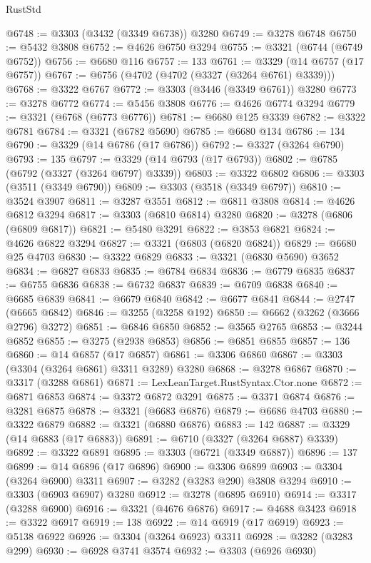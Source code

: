 \begin{lexlean}{RustStd}
\begin{coremodule}
@6748 := @3303 (@3432 (@3349 @6738)) @3280
@6749 := @3278 @6748
@6750 := @5432 @3808
@6752 := @4626 @6750 @3294
@6755 := @3321 (@6744 (@6749 @6752))
@6756 := @6680 @116
@6757 := 133
@6761 := @3329 (@14 @6757 (@17 @6757))
@6767 := @6756 (@4702 (@4702 (@3327 (@3264 @6761) @3339)))
@6768 := @3322 @6767
@6772 := @3303 (@3446 (@3349 @6761)) @3280
@6773 := @3278 @6772
@6774 := @5456 @3808
@6776 := @4626 @6774 @3294
@6779 := @3321 (@6768 (@6773 @6776))
@6781 := @6680 @125 @3339
@6782 := @3322 @6781
@6784 := @3321 (@6782 @5690)
@6785 := @6680 @134
@6786 := 134
@6790 := @3329 (@14 @6786 (@17 @6786))
@6792 := @3327 (@3264 @6790)
@6793 := 135
@6797 := @3329 (@14 @6793 (@17 @6793))
@6802 := @6785 (@6792 (@3327 (@3264 @6797) @3339))
@6803 := @3322 @6802
@6806 := @3303 (@3511 (@3349 @6790))
@6809 := @3303 (@3518 (@3349 @6797))
@6810 := @3524 @3907
@6811 := @3287 @3551
@6812 := @6811 @3808
@6814 := @4626 @6812 @3294
@6817 := @3303 (@6810 @6814) @3280
@6820 := @3278 (@6806 (@6809 @6817))
@6821 := @5480 @3291
@6822 := @3853 @6821
@6824 := @4626 @6822 @3294
@6827 := @3321 (@6803 (@6820 @6824))
@6829 := @6680 @25 @4703
@6830 := @3322 @6829
@6833 := @3321 (@6830 @5690) @3652
@6834 := @6827 @6833
@6835 := @6784 @6834
@6836 := @6779 @6835
@6837 := @6755 @6836
@6838 := @6732 @6837
@6839 := @6709 @6838
@6840 := @6685 @6839
@6841 := @6679 @6840
@6842 := @6677 @6841
@6844 := @2747 (@6665 @6842)
@6846 := @3255 (@3258 @192)
@6850 := @6662 (@3262 (@3666 @2796) @3272)
@6851 := @6846 @6850
@6852 := @3565 @2765
@6853 := @3244 @6852
@6855 := @3275 (@2938 @6853)
@6856 := @6851 @6855
@6857 := 136
@6860 := @14 @6857 (@17 @6857)
@6861 := @3306 @6860
@6867 := @3303 (@3304 (@3264 @6861) @3311 @3289) @3280
@6868 := @3278 @6867
@6870 := @3317 (@3288 @6861)
@6871 := LexLeanTarget.RustSyntax.Ctor.none
@6872 := @6871 @6853
@6874 := @3372 @6872 @3291
@6875 := @3371 @6874
@6876 := @3281 @6875
@6878 := @3321 (@6683 @6876)
@6879 := @6686 @4703
@6880 := @3322 @6879
@6882 := @3321 (@6880 @6876)
@6883 := 142
@6887 := @3329 (@14 @6883 (@17 @6883))
@6891 := @6710 (@3327 (@3264 @6887) @3339)
@6892 := @3322 @6891
@6895 := @3303 (@6721 (@3349 @6887))
@6896 := 137
@6899 := @14 @6896 (@17 @6896)
@6900 := @3306 @6899
@6903 := @3304 (@3264 @6900) @3311
@6907 := @3282 (@3283 @290) @3808 @3294
@6910 := @3303 (@6903 @6907) @3280
@6912 := @3278 (@6895 @6910)
@6914 := @3317 (@3288 @6900)
@6916 := @3321 (@4676 @6876)
@6917 := @4688 @3423
@6918 := @3322 @6917
@6919 := 138
@6922 := @14 @6919 (@17 @6919)
@6923 := @5138 @6922
@6926 := @3304 (@3264 @6923) @3311
@6928 := @3282 (@3283 @299)
@6930 := @6928 @3741 @3574
@6932 := @3303 (@6926 @6930)

\end{coremodule}
\end{lexlean}
